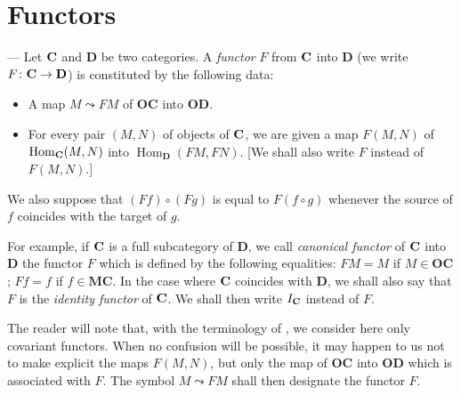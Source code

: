 %

\section{Functors}
--- Let $\mathbf{C}$ and $\mathbf{D}$ be two categories. A \emph{functor} $F$ from
$\mathbf{C}$ into $\mathbf{D}$ (we write $F\colon \mathbf{C}\to\mathbf{D}$) is constituted
by the following data:

\begin{itemize}
\item A map $M \leadsto FM$ of $\mathbf{OC}$ into $\mathbf{OD}$.
\item For every pair $(M,N)$ of objects of $\mathbf{C}$, we are given a map
      $F(M,N)$ of $\operatorname{Hom}_{\mathbf{C}}(M,N)$ into
      $\operatorname{Hom}_{\mathbf{D}}(FM,FN)$. [We shall also write $F$
      instead of $F(M,N)$.]
\end{itemize}

We also suppose that $(Ff)\circ(Fg)$ is equal to $F(f\circ g)$ whenever the
source of $f$ coincides with the target of $g$.

For example, if $\mathbf{C}$ is a full subcategory of $\mathbf{D}$, we call
\emph{canonical functor} of $\mathbf{C}$ into $\mathbf{D}$ the functor $F$ which is
defined by the following equalities: $FM = M$ if $M\in\mathbf{OC}$;
$Ff = f$ if $f\in\mathbf{MC}$. In the case where $\mathbf{C}$ coincides with
$\mathbf{D}$, we shall also say that $F$ is the \emph{identity functor} of
$\mathbf{C}$. We shall then write $I_{\mathbf{C}}$ instead of $F$.

The reader will note that, with the terminology of \cite{grothendieck-1}, we consider here only
covariant functors. When no confusion will be possible, it may happen to us not
to make explicit the maps $F(M,N)$, but only the map of $\mathbf{OC}$ into
$\mathbf{OD}$ which is associated with $F$. The symbol $M\leadsto FM$ shall
then designate the functor $F$.

